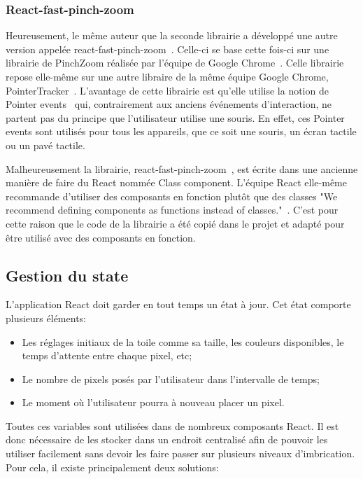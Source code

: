 \subsubsection{React-fast-pinch-zoom}

Heureusement, le même auteur que la seconde librairie a développé une autre version appelée react-fast-pinch-zoom~\cite{react-fast-pinch-zoom}. Celle-ci se base cette fois-ci sur une librairie de PinchZoom réalisée par l'équipe de Google Chrome~\cite{pinch-zoom-googlechromelabs}. Celle librairie repose elle-même sur une autre libraire de la même équipe Google Chrome, PointerTracker~\cite{pointer-tracker}. L'avantage de cette librairie est qu'elle utilise la notion de Pointer events~\cite{pointer-events} qui, contrairement aux anciens événements d'interaction, ne partent pas du principe que l'utilisateur utilise une souris. En effet, ces Pointer events sont utilisés pour tous les appareils, que ce soit une souris, un écran tactile ou un pavé tactile.

Malheureusement la librairie, react-fast-pinch-zoom~\cite{react-fast-pinch-zoom}, est écrite dans une ancienne manière de faire du React nommée Class component. L'équipe React elle-même recommande d'utiliser des composants en fonction plutôt que des classes "We recommend defining components as functions instead of classes."~\cite{react-class-component}. C'est pour cette raison que le code de la librairie a été copié dans le projet et adapté pour être utilisé avec des composants en fonction.

\subsection{Gestion du state}

L'application React doit garder en tout temps un état à jour. Cet état comporte plusieurs éléments:

\begin{itemize}
  \item Les réglages initiaux de la toile comme sa taille, les couleurs disponibles, le temps d'attente entre chaque pixel, etc;
  \item Le nombre de pixels posés par l'utilisateur dans l'intervalle de temps;
  \item Le moment où l'utilisateur pourra à nouveau placer un pixel.
\end{itemize}

Toutes ces variables sont utilisées dans de nombreux composants React. Il est donc nécessaire de les stocker dans un endroit centralisé afin de pouvoir les utiliser facilement sans devoir les faire passer sur plusieurs niveaux d'imbrication. Pour cela, il existe principalement deux solutions:

